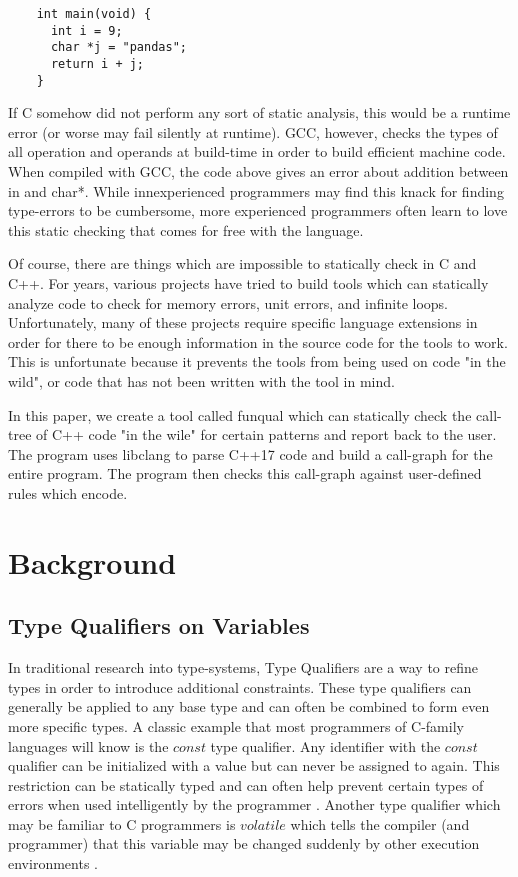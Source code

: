 \documentclass{article}
\begin{document}
  \begin{lstlisting}
    int main(void) {
      int i = 9;
      char *j = "pandas";
      return i + j;
    }
  \end{lstlisting}

  If C somehow did not perform any sort of static analysis, this would be a runtime error (or worse may fail silently at runtime).  GCC, however, checks the types of all operation and operands at build-time in order to build efficient machine code.  When compiled with GCC, the code above gives an error about addition between in and char*.  While innexperienced programmers may find this knack for finding type-errors to be cumbersome, more experienced programmers often learn to love this static checking that comes for free with the language.

  Of course, there are things which are impossible to statically check in C and C++.  For years, various projects have tried to build tools which can statically analyze code to check for memory errors, unit errors, and infinite loops.  Unfortunately, many of these projects require specific language extensions in order for there to be enough information in the source code for the tools to work.  This is unfortunate because it prevents the tools from being used on code "in the wild", or code that has not been written with the tool in mind.

  In this paper, we create a tool called funqual which can statically check the call-tree of C++ code "in the wile" for certain patterns and report back to the user.  The program uses libclang to parse C++17 code and build a call-graph for the entire program.  The program then checks this call-graph against user-defined rules which encode.

  \section{Background}

  \subsection{Type Qualifiers on Variables}

  In traditional research into type-systems, Type Qualifiers are a way to refine types in order to introduce additional constraints.  These type qualifiers can generally be applied to any base type and can often be combined to form even more specific types.  A classic example that most programmers of C-family languages will know is the $const$ type qualifier.  Any identifier with the $const$ qualifier can be initialized with a value but can never be assigned to again.  This restriction can be statically typed and can often help prevent certain types of errors when used intelligently by the programmer \cite{theory-of-qual}.  Another type qualifier which may be familiar to C programmers is $volatile$ which tells the compiler (and programmer) that this variable may be changed suddenly by other execution environments \cite{theory-of-qual}.
\end{document}
